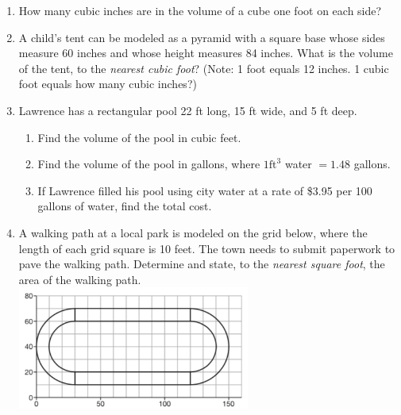 \documentclass[12pt, twoside]{article}
\begin{document}
\begin{enumerate}
\newpage
\item How many cubic inches are in the volume of a cube one foot on each side? \vspace{3.0cm}

\item A child’s tent can be modeled as a pyramid with a square base whose sides measure 60 inches and whose height measures 84 inches. What is the volume of the tent, to the \emph{nearest cubic foot}? (Note: 1 foot equals 12 inches. 1 cubic foot equals how many cubic inches?) \vspace{4cm}

\item Lawrence has a rectangular pool 22 ft long, 15 ft wide, and 5 ft deep.
  \begin{enumerate}
    \item Find the volume of the pool in cubic feet. \vspace{3cm}
    \item Find the volume of the pool in gallons, where $1 \mathrm{ ft}^3$ water $= 1.48$ gallons. \vspace{3cm}
    \item If Lawrence filled his pool using city water at a rate of \$3.95 per 100 gallons of water, find the total cost.
  \end{enumerate} \vspace{3cm}


\newpage
\item A walking path at a local park is modeled on the grid below, where the length of each grid square is 10 feet. The town needs to submit paperwork to pave the walking path. Determine and state, to the \emph{nearest square foot}, the area of the walking path.\\[0.3cm]
    \includegraphics[width=0.6\textwidth]{path_Jan2019-31.png} \vspace{3cm}


\end{enumerate}
\end{document}
